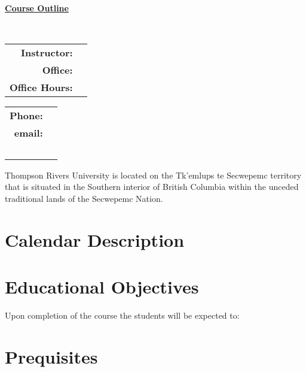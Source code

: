 \documentclass[10pt]{trumathoutline}
\begin{document}
	
	~
	
	\vspace{-1em}
	
	\begin{center}
		\bfseries
		{\Large \underline{Course Outline}}\\[0.5em]
		
		\coursecode
		
		\coursetitle\ \coursevectoring
		
		\term
		
	\end{center}
\begin{tabular}{ r l}
	\textbf{Instructor:}	& \instructorname 	\\
	\textbf{Office:} 		& \instructorofficerm \\
	\textbf{Office Hours:} 	& \instructorofficehrs
\end{tabular}\hfill
\begin{tabular}{ r l}
	 \textbf{Phone:} & \instructorphone\\
	 \textbf{email:} & \href{mailto:\instructoremail}{\instructoremail}\\
	~
\end{tabular}

Thompson Rivers University is located on the Tk’emlups te Secwepemc territory that is situated in the Southern interior of British Columbia within the unceded traditional lands of the Secwepemc Nation.

\section*{Calendar Description}
\begin{quote}
	\calendardescription
\end{quote}
	


\section*{Educational Objectives}
Upon completion of the course the students will be expected to:
\courseobjectives

\section*{Prequisites}
\courseprerequisites
\end{document}
